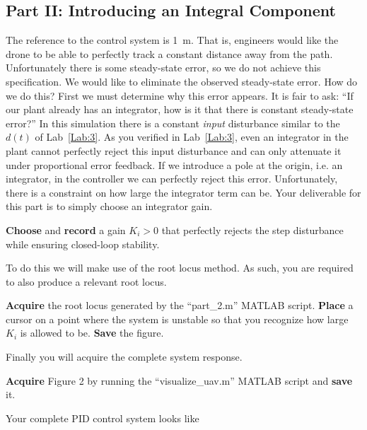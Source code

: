 \subsection{Part II: Introducing an Integral Component}
The reference to the control system is \SI{1}{\meter}.
That is, engineers would like the drone to be able to perfectly track a constant distance away from the path.
Unfortunately there is some steady-state error, so we do not achieve this specification.
We would like to eliminate the observed steady-state error.
How do we do this?
First we must determine why this error appears.
It is fair to ask:
``If our plant already has an integrator, how is it that there is constant steady-state error?''
In this simulation there is a constant \emph{input} disturbance similar to the \(d(t)\) of Lab~\ref{Lab:3}.
As you verified in Lab~\ref{Lab:3}, even an integrator in the plant cannot perfectly reject this input disturbance and can only attenuate it under proportional error feedback.
If we introduce a pole at the origin, i.e. an integrator, in the controller we can perfectly reject this error.
Unfortunately, there is a constraint on how large the integrator term can be.
Your deliverable for this part is to simply choose an integrator gain.
%
\begin{deliverable}[label={del:lab4:p2:1}]
  \textbf{Choose} and \textbf{record} a gain \(K_i > 0\) that perfectly rejects the step disturbance while ensuring closed-loop stability.
\end{deliverable}
%
To do this we will make use of the root locus method.
As such, you are required to also produce a relevant root locus.
%
\begin{deliverable}[label={del:lab4:p2:2}]
  \textbf{Acquire} the root locus generated by the ``part\_2.m'' MATLAB script.
  \textbf{Place} a cursor on a point where the system is unstable so that you recognize how large \(K_i\) is allowed to be.
  \textbf{Save} the figure.
\end{deliverable}
%
Finally you will acquire the complete system response.
%
\begin{deliverable}[label={del:lab4:p2:3}]
  \textbf{Acquire} Figure 2 by running the ``visualize\_uav.m'' MATLAB script and \textbf{save} it.
\end{deliverable}
%
Your complete PID control system looks like
%
